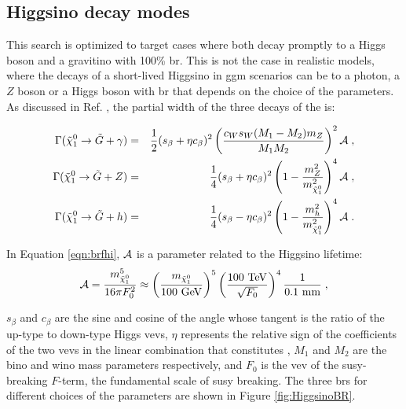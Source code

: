\subsection{Higgsino decay modes}

This search is optimized to target cases where both \hino decay promptly to a Higgs boson and a gravitino with 100\% \gls{br}.
This is not the case in realistic models, where the decays of a short-lived Higgsino in \gls{ggm} scenarios  
can be to a photon, a $Z$ boson or a Higgs boson with 
\gls{br} that depends on the choice of the parameters.
As discussed in Ref. \cite{Meade:2009qv}, the partial width of the three decays of the \ninoone is:

\begin{eqnarray}
\label{eqn:brfhi}
\Gamma(\tilde\chi_1^0\to \tilde G+\gamma)&=& {1\over2}(s_\beta+\eta c_\beta)^2\left({c_Ws_W(M_1-M_2)m_Z\over M_1 M_2}\right)^2 {\cal A} \;,
\nonumber\\
 \Gamma(\tilde\chi_1^0\to \tilde G+Z)&=&{1\over4}(s_\beta+\eta c_\beta)^2\left(1 - \frac{m_Z^2}{m^2_{\tilde{\chi}^0_1}}\right)^4 {\cal A} \;,\\
  \Gamma(\tilde\chi_1^0\to \tilde G+h)&=&{1\over4}(s_\beta-\eta c_\beta)^2\left(1 - \frac{m_h^2}{m^2_{\tilde{\chi}^0_1}}\right)^4 {\cal A} \;. \nonumber
\end{eqnarray}

\noindent In Equation \ref{eqn:brfhi}, ${\cal A}$ is a parameter related to the Higgsino lifetime:
\begin{equation}
\label{eqn:decaylength}
{\cal A} = \frac{m^5_{\tilde{\chi}^0_1}}{16\pi F_0^2} \approx \left(\frac{m_{\tilde{\chi}^0_1}}{100~{\rm GeV}}\right)^5 \left(\frac{100~\rm{TeV}}{\sqrt{F_0}}\right)^4 \frac{1}{0.1~{\rm mm}} \;,
\end{equation}

\noindent $s_\beta$ and $c_\beta$ are the sine and cosine of the angle whose tangent is 
the ratio of the up-type to down-type Higgs \glspl{vev}, 
$\eta$ represents the relative sign of the coefficients 
of the two \glspl{vev} in the linear combination that constitutes \ninoone,
$M_1$ and $M_2$ are the bino and wino mass parameters respectively, and 
$F_0$ is the \gls{vev} of the \gls{susy}-breaking $F$-term, the fundamental scale of \gls{susy} breaking.
The three \glspl{br} for different choices of the parameters are shown in Figure \ref{fig:HiggsinoBR}.

